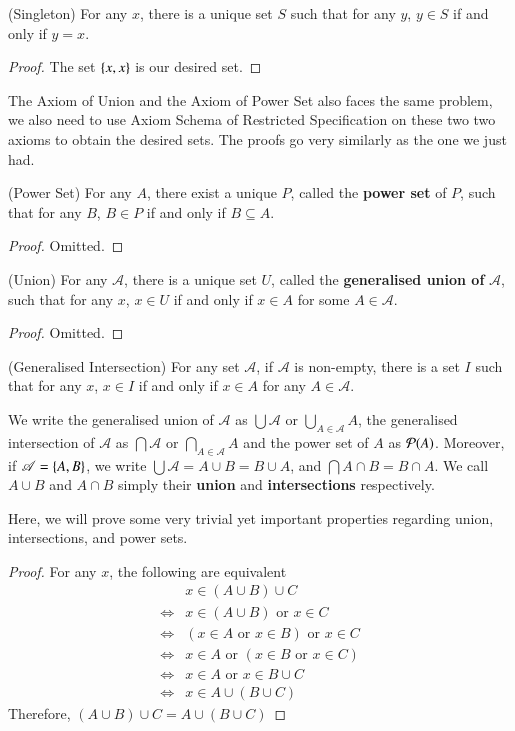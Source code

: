 \begin{prop}
    (Singleton) For any $x$, there is a unique set $S$ such that for any $y$, $y\in S$ if and only if $y= x$.
\end{prop}
\begin{proof}
    The set $\{x,x\}$ is our desired set.
\end{proof}
The Axiom of Union and the Axiom of Power Set also faces the same problem, we also need to use Axiom Schema of Restricted Specification on these two two axioms to obtain the desired sets. The proofs go very similarly as the one we just had. 
\begin{prop}
    (Power Set) For any $A$, there exist a unique $P$, called the \textbf{power set} of $P$, such that for any $B$, $B\in P$ if and only if $B\subseteq A$.
\end{prop}
\begin{proof}
    Omitted.
\end{proof}
\begin{prop}
    (Union) For any $\mathscr A$, there is a unique set $U$, called the \textbf{generalised union of }$\mathscr A$, such that for any $x$, $x\in U$ if and only if $x\in A$ for some $A\in \mathscr A$.
\end{prop}
\begin{proof}
    Omitted.
\end{proof}
\begin{prop}
    (Generalised Intersection) For any set $\mathscr A$, if $\mathscr A$ is non-empty, there is a set $I$ such that for any $x$, $x\in I$ if and only if $x\in A$ for any $A\in\mathscr A$. 
\end{prop}
\begin{rem}
    We write the generalised union of $\mathscr A$ as $\bigcup\mathscr A$ or $\displaystyle \bigcup_{A\in\mathscr A}A$, the generalised intersection of $\mathscr A$ as $\bigcap \mathscr A$ or $\displaystyle\bigcap_{A\in\mathscr A}A$ and the power set of $A$ as $\mathcal{P}(A)$. Moreover, if $\mathscr A= \{A,B\}$, we write $\bigcup \mathscr A = A\cup B = B\cup A$, and $\bigcap A\cap B = B\cap A$. We call $A\cup B$ and $A\cap B$ simply their \textbf{union} and \textbf{intersections} respectively.
\end{rem}
Here, we will prove some very trivial yet important properties regarding union, intersections, and power sets.
\begin{proof}
    For any $x$, the following are equivalent 
    \begin{align*}
        & x\in (A\cup B)\cup C\\
        \Leftrightarrow & x\in (A\cup B)\text{ or }x\in C\\
        \Leftrightarrow & (x\in A\text{ or }x\in B)\text{ or }x\in C\\
        \Leftrightarrow & x\in A\text{ or }(x\in B\text{ or }x\in C)\\
        \Leftrightarrow & x\in A \text{ or }x\in B\cup C\\
        \Leftrightarrow & x\in A \cup(B\cup C)
    \end{align*}
    Therefore, $(A\cup B)\cup C = A\cup (B\cup C)$
\end{proof}
